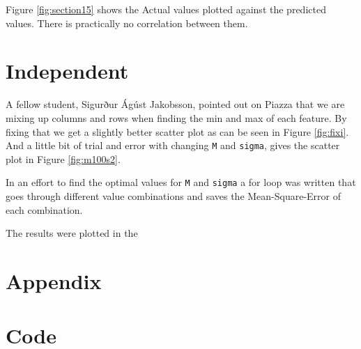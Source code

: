 \documentclass{article}
\begin{document}
Figure \ref{fig:section15} shows the Actual values plotted against the predicted values. There is practically no correlation between them. 

\section*{Independent}
A fellow student, Sigurður Ágúst Jakobsson, pointed out on Piazza that we are mixing up columns and rows when finding the min and max of each feature. By fixing that we get a slightly better scatter plot as can be seen in Figure \ref{fig:fixi}. And a little bit of trial and error with changing \verb!M! and \verb!sigma!, gives the scatter plot in Figure \ref{fig:m100s2}.

In an effort to find the optimal values for \verb!M! and \verb!sigma! a for loop was written that goes through different value combinations and saves the Mean-Square-Error of each combination.

The results were plotted in the 

\newpage
\section*{Appendix}
\appendix
\section{Code}


\end{document}
